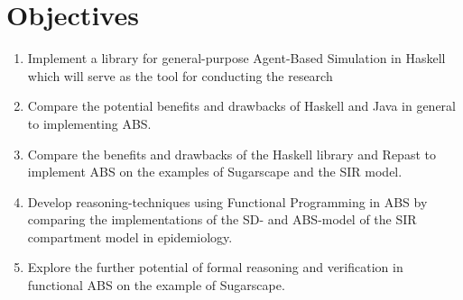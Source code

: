 \section{Objectives}
\begin{enumerate}
	\item Implement a library for general-purpose Agent-Based Simulation in Haskell which will serve as the tool for conducting the research 
	
	\item Compare the potential benefits and drawbacks of Haskell and Java in general to implementing ABS.
	
	\item Compare the benefits and drawbacks of the Haskell library and Repast to implement ABS on the examples of Sugarscape and the SIR model.
	
	\item Develop reasoning-techniques using Functional Programming in ABS by comparing the implementations of the SD- and ABS-model of the SIR compartment model in epidemiology.
	
	\item Explore the further potential of formal reasoning and verification in functional ABS on the example of Sugarscape.
\end{enumerate}

